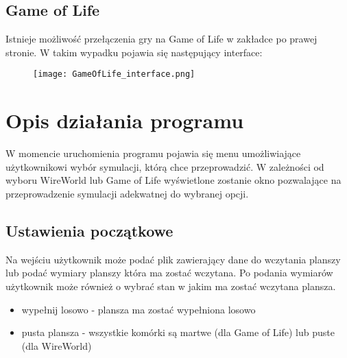 \documentclass[10pt, oneside]{article}
\begin{document}
\subsection{Game of Life}

Istnieje możliwość przełączenia gry na Game of Life w zakładce po prawej stronie. W takim wypadku pojawia się następujący interface:

\begin{figure}[H]
	\centering
	\texttt{[image: GameOfLife\_interface.png]}
	
\end{figure}

\section{Opis działania programu}
W momencie uruchomienia programu pojawia się menu umożliwiające użytkownikowi wybór symulacji, którą chce przeprowadzić. W zależności od wyboru WireWorld lub Game of Life wyświetlone zostanie okno pozwalające na przeprowadzenie symulacji adekwatnej do wybranej opcji.

\subsection{Ustawienia początkowe}
Na wejściu użytkownik może podać plik zawierający dane do wczytania planszy lub podać wymiary planszy która ma zostać wczytana. Po podania wymiarów użytkownik może również o wybrać stan w jakim ma zostać wczytana plansza. 
\begin{itemize}
\item wypełnij losowo - plansza ma zostać wypełniona losowo
\item pusta plansza - wszystkie komórki są martwe (dla  Game of Life) lub puste (dla WireWorld)
\end{itemize}
\end{document}
